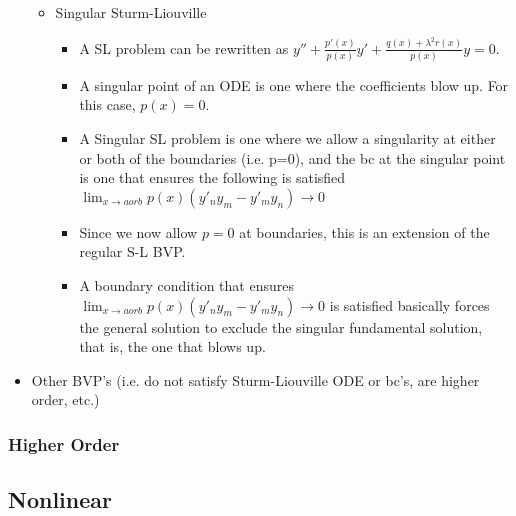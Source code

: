 \documentclass[11pt]{article}
\begin{document}
\begin{itemize}
\begin{itemize}
		\item Singular Sturm-Liouville
			\begin{itemize}
			\item A SL problem can be rewritten as $y''+\frac{p'(x)}{p(x)}y'+\frac{q(x)+\lambda^2r(x)}{p(x)}y=0$.
			\item A singular point of an ODE is one where the coefficients blow up. For this case, $p(x) = 0$.
			\item A Singular SL problem is one where we allow a singularity at either or both of the boundaries (i.e. p=0), and the bc at the singular point is one that ensures the following is satisfied $\lim_{x \to a or b} p(x)(y'_ny_m-y'_my_n)\to0$ 
			\item Since we now allow $p=0$ at boundaries, this is an extension of the regular S-L BVP.
			\item A boundary condition that ensures $\lim_{x \to a or b} p(x)(y'_ny_m-y'_my_n)\to0$  is satisfied basically forces the general solution to exclude the singular fundamental solution, that is, the one that blows up.
			\end{itemize}
		\end{itemize}
	\item Other BVP's (i.e. do not satisfy Sturm-Liouville ODE or bc's, are higher order, etc.)
	\end{itemize}
\subsubsection{Higher Order}
\subsection{Nonlinear}
\end{document}
